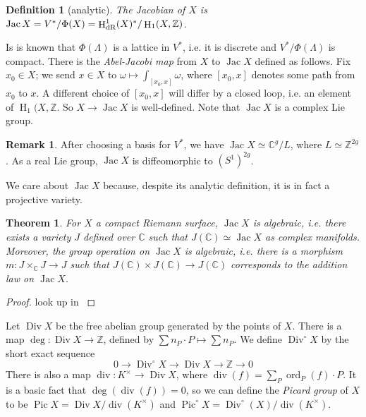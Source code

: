 \documentclass{article}
\DeclareMathOperator{\Div}{Div}
\DeclareMathOperator{\h}{H}
\DeclareMathOperator{\jac}{Jac}
\DeclareMathOperator{\ord}{ord}
\DeclareMathOperator{\pic}{Pic}
\newtheorem{theorem}[subsection]{Theorem}
\newtheorem{definition}[subsection]{Definition}
\theoremstyle{definition}
\newtheorem{remark}[subsection]{Remark}
\begin{document}
\begin{definition}[analytic]
The \emph{Jacobian} of $X$ is 
$\jac X=V^*/\Phi(X) = \h_\textnormal{dR}^1(X)^*/\h_1(X,\mathbb{Z})$. 
\end{definition}

Is is known that $\Phi(\Lambda)$ is a lattice in $V^*$, i.e. it is discrete 
and $V^*/\Phi(\Lambda)$ is compact. There is the \emph{Abel-Jacobi map} from 
$X$ to $\jac X$ defined as follows. Fix $x_0\in X$; we send $x\in X$ to 
$\omega\mapsto \int_{[x_0,x]} \omega$, where $[x_0,x]$ denotes some path from 
$x_0$ to $x$. A different choice of $[x_0,x]$ will differ by a closed loop, 
i.e. an element of $\h_1(X,\mathbb{Z}$. So $X\to\jac X$ is well-defined. Note 
that $\jac X$ is a complex Lie group. 

\begin{remark}
After choosing a basis for $V^*$, we have $\jac X\simeq \mathbb{C}^g/L$, where 
$L\simeq \mathbb{Z}^{2 g}$. As a real Lie group, $\jac X$ is diffeomorphic to 
$(S^1)^{2 g}$. 
\end{remark}

We care about $\jac X$ because, despite its analytic definition, it is in fact 
a projective variety.

\begin{theorem}
For $X$ a compact Riemann surface, $\jac X$ is algebraic, i.e. there exists a 
variety $J$ defined over $\mathbb{C}$ such that $J(\mathbb{C})\simeq\jac X$ as 
complex manifolds. Moreover, the group operation on $\jac X$ is algebraic, 
i.e. there is a morphism $m:J\times_\mathbb{C} J\to J$ such that 
$J(\mathbb{C})\times J(\mathbb{C})\to J(\mathbb{C})$ corresponds to the 
addition law on $\jac X$. 
\end{theorem}
\begin{proof}
look up in \cite{mu08}
\end{proof}

Let $\Div X$ be the free abelian group generated by the points of $X$. There 
is a map $\deg:\Div X\to \mathbb{Z}$, defined by 
$\sum n_P\cdot P\mapsto \sum n_P$. We define $\Div^\circ X$ by the short exact 
sequence 
\[
  0 \to \Div^\circ X \to \Div X \to \mathbb{Z} \to 0
\]
There is also a map $\operatorname{div}:K^\times\to \Div X$, where 
$\operatorname{div}(f) = \sum_P \ord_P(f)\cdot P$. It is a basic fact that 
$\deg(\operatorname{div}(f)) = 0$, so we can define the \emph{Picard group} 
of $X$ to be $\pic X = \Div X/\operatorname{div}(K^\times)$ and 
$\pic^\circ X = \Div^\circ (X)/\operatorname{div}(K^\times)$. 
\end{document}
